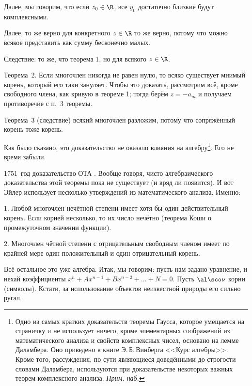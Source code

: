\documentclass[a4paper,oneside,fleqn,10pt]{article}
\begin{document}
Далее, мы говорим, что если $z_0 \in \R$, все $y_0$ достаточно близкие будут комплексными.

Далее, то же верно для конкретного $z \in \R$ то же верно, потому что можно всякое представить как сумму бесконечно малых.

Следствие: то же, что теорема 1, но для всякого $z \in \R$.

Теорема~2. Если многочлен никогда не равен нулю, то всяко существует мнимый корень, который
его таки зануляет.  Чтобы это доказать, рассмотрим всё, кроме свободного члена, как кривую
в теореме 1; тогда берём $z = -a_m$ и получаем противоречие с п.~3 теоремы.

Теорема~3 (следствие) всякий многочлен разложим, потому что сопряжённый корень тоже корень.

Как было сказано, это доказательство не оказало влияния на алгебру\footnote{Одно
из самых кратких доказательств теоремы Гаусса, которое умещается на страничку
и не использует ничего, кроме элементарных соображений из математического анализа
и свойств комплексных чисел, основано на лемме Даламбера. Оно приведено в книге
Э.\,Б.\,Винберга <<Курс алгебры>>. Кроме того, рассуждения, по сути являющиеся доведёнными до
строгости словами Даламбера, используются при доказательстве некоторых важных теорем комплексного
анализа. \emph{Прим. наб.}}. Его не время забыли.

1751~год доказательство ОТА . Вообще говоря, чисто алгебраического доказательства этой
теоремы пока не существует (и вряд ли появится). И вот Эйлер использует несколько
утверждений из математического анализа. Именно:

1. Любой многочлен нечётной степени имеет хотя бы один действительный корень.
Если корней несколько, то их число нечётно (теорема Коши о промежуточном значении функции).

2. Многочлен чётной степени с отрицательным свободным членом
имеет по крайней мере один положительный и один отрицательный корень.

Всё остальное это уже алгебра. Итак, мы говорим: пусть нам задано уравнение,
и нехай коэффициенты $x^n + Ax^{n-1} + B x^{n-2}+ \dots + N = 0$.
Пусть $\al\sco \nu$ корни (символы). Кстати, за использование
объектов неизвестной природы его сильно ругал .
\end{document}
